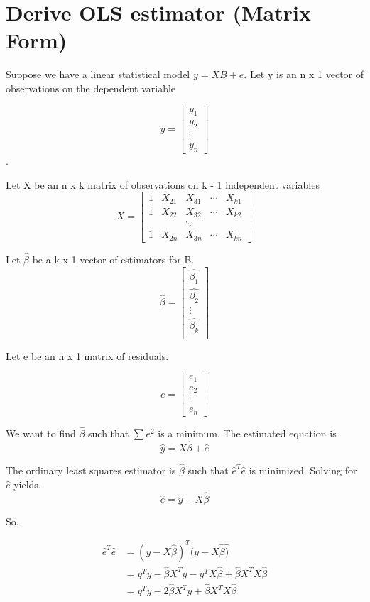 \documentclass[]{book}
\begin{document}
\hypertarget{derive-ols-estimator-matrix-form}{%
\section{Derive OLS estimator (Matrix Form)}\label{derive-ols-estimator-matrix-form}}

Suppose we have a linear statistical model \(y=XB+e\). Let y is an n x 1 vector of observations on the dependent variable

\[y = \begin{bmatrix}y_1\\y_2\\\vdots\\y_n\end{bmatrix}\].

Let X be an n x k matrix of observations on k - 1 independent variables
\[X = \begin{bmatrix}1 & X_{21} & X_{31}&\cdots&X_{k1}\\
1 & X_{22} & X_{32}&\cdots&X_{k2}\\
&&\ddots\\
1 & X_{2n} & X_{3n}&\cdots&X_{kn}
\end{bmatrix}\]

Let \(\hat{\beta}\) be a k x 1 vector of estimators for B.
\[\hat{\beta}=\begin{bmatrix}\hat{\beta_1}\\
\hat{\beta_2}\\
\vdots\\
\hat{\beta_k}\\
\end{bmatrix}\]

Let e be an n x 1 matrix of residuals.

\[e = \begin{bmatrix}e_1\\e_2\\\vdots\\e_n\end{bmatrix}\]

We want to find \(\hat{\beta}\) such that \(\sum{e^2}\) is a minimum. The estimated equation is \[\hat{y} = X\hat{\beta}+\hat{e}\]

The ordinary least squares estimator is \(\hat{\beta}\) such that \(\hat{e}^T\hat{e}\) is minimized. Solving for \(\hat{e}\) yields. \[\hat{e}=y-X\hat{\beta}\]

So,

\[\begin{aligned}\hat{e}^T\hat{e}&=(y-X\hat{\beta})^T(y-X\hat{\beta)}\\
&= y^Ty-\hat{\beta}X^Ty-y^TX\hat{\beta}  + \hat{\beta}X^TX\hat{\beta}\\
&=y^Ty-2\hat{\beta}X^Ty+\hat{\beta}X^TX\hat{\beta}\\
\end{aligned}\]
\end{document}
